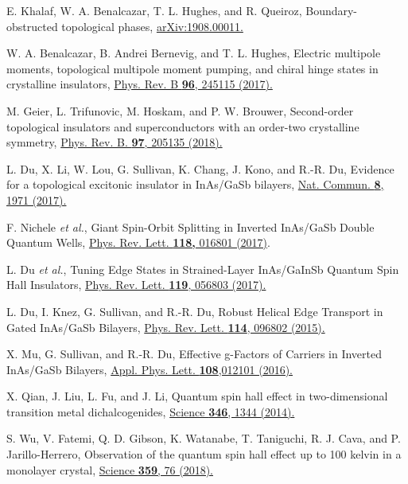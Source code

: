\documentclass[twocolumn,prl,floatfix,citeautoscript,nofootinbib,superscriptaddress]{revtex4}
\begin{document}
\begin{thebibliography}{99}
 E. Khalaf, W. A. Benalcazar, T. L. Hughes, and R.
Queiroz, Boundary-obstructed topological phases, \href{https://arxiv.org/abs/1908.00011}%
{arXiv:1908.00011.}

 W. A. Benalcazar, B. Andrei Bernevig, and T. L.
Hughes, Electric multipole moments, topological multipole moment pumping,
and chiral hinge states in crystalline insulators, \href{https://journals.aps.org/prb/abstract/10.1103/PhysRevB.96.245115}%
{Phys. Rev. B \textbf{96}, 245115 (2017).}

 M. Geier, L. Trifunovic, M. Hoskam, and P. W. Brouwer,
Second-order topological insulators and superconductors with an order-two
crystalline symmetry, \href{https://doi.org/10.1103/PhysRevB.97.205135}{%
Phys. Rev. B. \textbf{97}, 205135 (2018).}

 L. Du, X. Li, W. Lou, G. Sullivan, K. Chang, J. Kono, and
R.-R. Du, Evidence for a topological excitonic insulator in InAs/GaSb
bilayers, \href{https://doi.org/10.1038/s41467-017-01988-1}{ Nat. Commun.
\textbf{8}, 1971 (2017).}

 F. Nichele \textit{et al.}, Giant Spin-Orbit Splitting
in Inverted InAs/GaSb Double Quantum Wells, \href{https://doi.org/10.1103/PhysRevLett.118.016801}%
{ Phys. Rev. Lett. \textbf{118,} 016801 (2017)}.

 L. Du \textit{et al.}, Tuning Edge States in
Strained-Layer InAs/GaInSb Quantum Spin Hall Insulators, \href{https://doi.org/10.1103/PhysRevLett.119.056803}%
{Phys. Rev. Lett. \textbf{119}, 056803 (2017).}

 L. Du, I. Knez, G. Sullivan, and R.-R. Du, Robust Helical
Edge Transport in Gated InAs/GaSb Bilayers, \href{http://dx.doi.org/10.1103/PhysRevLett.114.096802}%
{ Phys. Rev. Lett. \textbf{114}, 096802 (2015).}

 X. Mu, G. Sullivan, and R.-R. Du, Effective g-Factors of
Carriers in Inverted InAs/GaSb Bilayers, \href{https://doi.org/10.1063/1.4939230}%
{Appl. Phys. Lett. \textbf{108},012101 (2016).}

 X. Qian, J. Liu, L. Fu, and J. Li, Quantum spin hall
effect in two-dimensional transition metal dichalcogenides, \href{http://dx.doi.org/ 10.1126/science.1256815}%
{Science \textbf{346}, 1344 (2014).}

 S. Wu, V. Fatemi, Q. D. Gibson, K. Watanabe, T. Taniguchi,
R. J. Cava, and P. Jarillo-Herrero, Observation of the quantum spin hall
effect up to 100 kelvin in a monolayer crystal, \href{http://dx.doi.org/ 10.1126/science.aan6003}%
{Science \textbf{359}, 76 (2018).}


\end{thebibliography}
\end{document}
